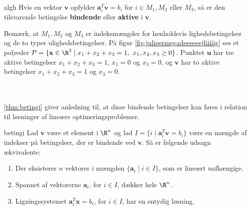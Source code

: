 %
\begin{defn}{}{algh}
Hvis en vektor $\textbf{v}$ opfylder $\textbf{a}^T_i\textbf{v}= b_i$ for $i \in M_1, M_2$ eller $M_3$, så er den tilsvarende betingelse \textbf{bindende} eller \textbf{aktive} i $\textbf{v}$.
\end{defn}\noindent
%
Bemærk, at $M_1, M_2$ og $M_3$ er indeksmængder for henholdsvis lighedsbetingelser og de to typer ulighedsbetingelser.
På figur \ref{fig:julieermegadeeeeeejliiiiig} ses et polyeder $\mathcal{P}= \{ \mathbf{x} \in \R^3 \mid x_1 + x_2 + x_3 = 1, \text{  } x_1 , x_2, x_3 \geq 0  \}$. 
Punktet $\textbf{u}$ har tre aktive betingelser $x_1 + x_2 + x_3 = 1$, $x_1=0$ og $x_3=0$, og $\mathbf{v}$ har to aktive betingelser $x_1 + x_2 + x_3 = 1$ og $x_3=0$.
%

\\\\
%
\ref{thm:betingi} giver anledning til, at disse bindende betingelser kan føres i relation til løsninger af lineære optimeringsproblemer.
%
%
\begin{thm}{}{betingi}
Lad $\textbf{v}$ være et element i $\R^n$ og lad $I=\{i \mid \textbf{a}^T_i\textbf{v}=b_i\}$ være en mængde af indekser på betingelser, der er bindende ved $\textbf{v}$.
Så er følgende udsagn ækvivalente:
%
\begin{enumerate}[label=(\alph*)]
\item Der eksisterer $n$ vektorer i mængden $\{\textbf{a}_i \mid i \in I \}$, som er lineært uafhængige.
\item Spannet af vektorerne $\textbf{a}_i$, for $i \in I$, dækker hele $\R^n$.
\item Ligningssystemet $\textbf{a}^T_i\textbf{x}= b_i$, for $i \in I$, har en entydig løsning.
\end{enumerate}
\end{thm}
%
